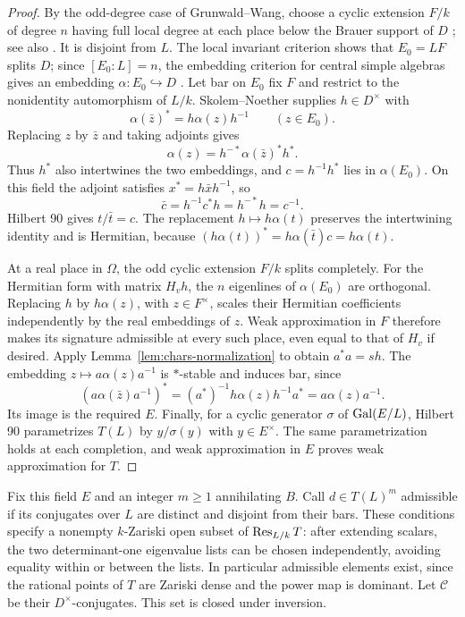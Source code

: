 \begin{proof}
By the odd-degree case of Grunwald--Wang, choose a cyclic extension
$F/k$ of degree $n$ having full local degree at each place below the
Brauer support of $D$ \cite{Neukirch}; see also
\cite[Chapter~VIII, Theorem~2.4 and Corollary~2.5]{MilneCFT}.
It is disjoint from $L$.
The local invariant criterion shows that $E_0=LF$ splits $D$; since
$[E_0:L]=n$, the embedding criterion for central simple algebras gives
an embedding $\alpha:E_0\hookrightarrow D$ \cite{Reiner}.
Let bar on $E_0$ fix $F$ and restrict to the nonidentity automorphism
of $L/k$. Skolem--Noether supplies $h\in D^\times$ with
\[
 \alpha(\bar z)^*=h\alpha(z)h^{-1}\qquad(z\in E_0).
\]
Replacing $z$ by $\bar z$ and taking adjoints gives
\[
 \alpha(z)=h^{-*}\alpha(\bar z)^*h^*.
\]
Thus $h^*$ also intertwines the two embeddings, and
$c=h^{-1}h^*$ lies in $\alpha(E_0)$. On this field the adjoint satisfies
$x^*=h\bar xh^{-1}$, so
\[
 \bar c=h^{-1}c^*h=h^{-*}h=c^{-1}.
\]
Hilbert 90 gives $t/\bar t=c$. The replacement
$h\mapsto h\alpha(t)$ preserves the intertwining identity and is
Hermitian, because
$(h\alpha(t))^*=h\alpha(\bar t)c=h\alpha(t)$.

At a real place in $\Omega$, the odd cyclic extension $F/k$ splits
completely. For the Hermitian form with matrix $H_vh$, the $n$
eigenlines of $\alpha(E_0)$ are orthogonal. Replacing $h$ by
$h\alpha(z)$, with $z\in F^\times$, scales their Hermitian coefficients
independently by the real embeddings of $z$. Weak approximation in $F$
therefore makes its signature admissible at every such place, even
equal to that of $H_v$ if desired. Apply
Lemma~\ref{lem:chars-normalization} to obtain $a^*a=sh$. The embedding
$z\mapsto a\alpha(z)a^{-1}$ is $*$-stable and induces bar, since
\[
 (a\alpha(\bar z)a^{-1})^*
 =(a^*)^{-1}h\alpha(z)h^{-1}a^*
 =a\alpha(z)a^{-1}.
\]
Its image is the required $E$. Finally, for a cyclic generator $\sigma$
of $\operatorname{Gal}(E/L)$, Hilbert 90 parametrizes $T(L)$ by
$y/\sigma(y)$ with $y\in E^\times$. The same parametrization holds at
each completion, and weak approximation in $E$ proves weak
approximation for $T$.
\end{proof}

Fix this field $E$ and an integer $m\ge1$ annihilating $B$. Call
$d\in T(L)^m$ admissible if its conjugates over $L$ are distinct and
disjoint from their bars. These conditions specify a nonempty $k$-Zariski
open subset of $\operatorname{Res}_{L/k}T$: after extending scalars, the two
determinant-one eigenvalue
lists can be chosen independently, avoiding equality within or between
the lists. In particular admissible elements exist, since the rational
points of $T$ are Zariski dense and the power map is dominant.
Let $\mathcal C$ be their $D^\times$-conjugates. This set is closed
under inversion.

